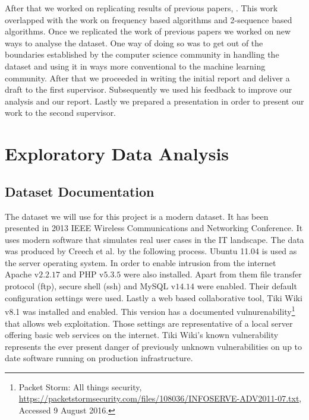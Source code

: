 \documentclass[reqno,openany,12pt]{amsbook}
\begin{document}
After that we worked on replicating results of previous papers\cite{adf1}, \cite{adf2}. This work overlapped with the work on frequency based algorithms and 2-sequence based algorithms. Once we replicated the work of previous papers we worked on new ways to analyse the dataset. One way of doing so was to get out of the boundaries established by the computer science community in handling the dataset and using it in ways more conventional to the machine learning community. After that we proceeded in writing the initial report and deliver a draft to the first supervisor. Subsequently we used his feedback to improve our analysis and our report. Lastly we prepared a presentation in order to present our work to the second supervisor.


\chapter{Exploratory Data Analysis}

\section{Dataset Documentation}

The dataset we will use for this project is a modern dataset. It has been presented in 2013 IEEE Wireless Communications and Networking Conference\cite{dat2}. It uses modern software that simulates real user cases in the IT landscape. The data was produced by Creech et al.\cite{dat2} by the following process. Ubuntu 11.04 is used as the server operating system. In order to enable intrusion from the internet Apache v$2.2.17$ and PHP v$5.3.5$ were also installed.  Apart from them file transfer protocol (ftp), secure shell (ssh) and MySQL v$14.14$ were enabled. Their default configuration settings were used. Lastly a web based collaborative tool, Tiki Wiki v8.1 was installed and enabled. This version has a documented vulnurenability\footnote{Packet Storm: All things security, \url{https://packetstormsecurity.com/files/108036/INFOSERVE-ADV2011-07.txt}, Accessed 9 August 2016.} that allows web exploitation. Those settings are representative of a local server offering basic web services on the internet. Tiki Wiki's known vulnerability represents the ever present danger of previously unknown vulnerabilities on up to date software running on production infrastructure.

\end{document}
